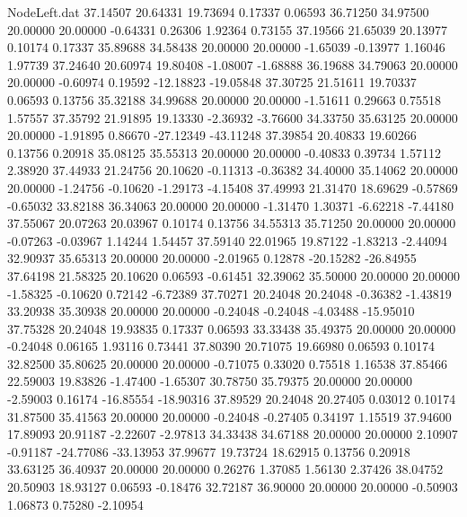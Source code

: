 \begin{filecontents}{NodeLeft.dat}
  37.14507   20.64331   19.73694     0.17337    0.06593   36.71250   34.97500   20.00000   20.00000   -0.64331    0.26306    1.92364    0.73155
  37.19566   21.65039   20.13977     0.10174    0.17337   35.89688   34.58438   20.00000   20.00000   -1.65039   -0.13977    1.16046    1.97739
  37.24640   20.60974   19.80408    -1.08007   -1.68888   36.19688   34.79063   20.00000   20.00000   -0.60974    0.19592  -12.18823  -19.05848
  37.30725   21.51611   19.70337     0.06593    0.13756   35.32188   34.99688   20.00000   20.00000   -1.51611    0.29663    0.75518    1.57557
  37.35792   21.91895   19.13330    -2.36932   -3.76600   34.33750   35.63125   20.00000   20.00000   -1.91895    0.86670  -27.12349  -43.11248
  37.39854   20.40833   19.60266     0.13756    0.20918   35.08125   35.55313   20.00000   20.00000   -0.40833    0.39734    1.57112    2.38920
  37.44933   21.24756   20.10620    -0.11313   -0.36382   34.40000   35.14062   20.00000   20.00000   -1.24756   -0.10620   -1.29173   -4.15408
  37.49993   21.31470   18.69629    -0.57869   -0.65032   33.82188   36.34063   20.00000   20.00000   -1.31470    1.30371   -6.62218   -7.44180
  37.55067   20.07263   20.03967     0.10174    0.13756   34.55313   35.71250   20.00000   20.00000   -0.07263   -0.03967    1.14244    1.54457
  37.59140   22.01965   19.87122    -1.83213   -2.44094   32.90937   35.65313   20.00000   20.00000   -2.01965    0.12878  -20.15282  -26.84955
  37.64198   21.58325   20.10620     0.06593   -0.61451   32.39062   35.50000   20.00000   20.00000   -1.58325   -0.10620    0.72142   -6.72389
  37.70271   20.24048   20.24048    -0.36382   -1.43819   33.20938   35.30938   20.00000   20.00000   -0.24048   -0.24048   -4.03488  -15.95010
  37.75328   20.24048   19.93835     0.17337    0.06593   33.33438   35.49375   20.00000   20.00000   -0.24048    0.06165    1.93116    0.73441
  37.80390   20.71075   19.66980     0.06593    0.10174   32.82500   35.80625   20.00000   20.00000   -0.71075    0.33020    0.75518    1.16538
  37.85466   22.59003   19.83826    -1.47400   -1.65307   30.78750   35.79375   20.00000   20.00000   -2.59003    0.16174  -16.85554  -18.90316
  37.89529   20.24048   20.27405     0.03012    0.10174   31.87500   35.41563   20.00000   20.00000   -0.24048   -0.27405    0.34197    1.15519
  37.94600   17.89093   20.91187    -2.22607   -2.97813   34.33438   34.67188   20.00000   20.00000    2.10907   -0.91187  -24.77086  -33.13953
  37.99677   19.73724   18.62915     0.13756    0.20918   33.63125   36.40937   20.00000   20.00000    0.26276    1.37085    1.56130    2.37426
  38.04752   20.50903   18.93127     0.06593   -0.18476   32.72187   36.90000   20.00000   20.00000   -0.50903    1.06873    0.75280   -2.10954

\end{filecontents}
